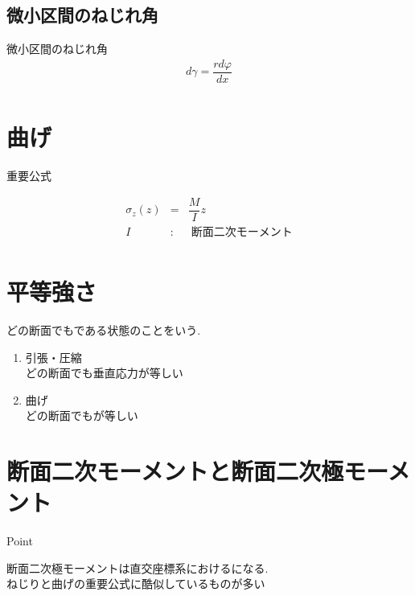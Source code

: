 \documentclass[a4paper]{jsarticle}
\begin{document}
\subsection{微小区間のねじれ角}
\begin{itembox}[l]{微小区間のねじれ角}
    \begin{eqnarray*}
        d\gamma=\dfrac{rd\varphi}{dx}\\
    \end{eqnarray*}
\end{itembox}
\section{曲げ}
\begin{itembox}[l]{重要公式}
    \begin{center}
        \begin{eqnarray*}
            \sigma_z\left(z\right)&=&\dfrac{M}{I}z\\
            I&:&\;断面二次モーメント\\
        \end{eqnarray*}
    \end{center}
\end{itembox}
\section{平等強さ}
どの断面でもである状態のことをいう.\\
\begin{enumerate}[(1)]
    \item 引張・圧縮\\
          どの断面でも垂直応力が等しい
    \item 曲げ\\
          どの断面でもが等しい
\end{enumerate}
\section{断面二次モーメントと断面二次極モーメント}
\begin{itembox}[l]{Point}
    \begin{center}
        断面二次極モーメントは直交座標系におけるになる.\\
        ねじりと曲げの重要公式に酷似しているものが多い
    \end{center}
\end{itembox}
\end{document}
